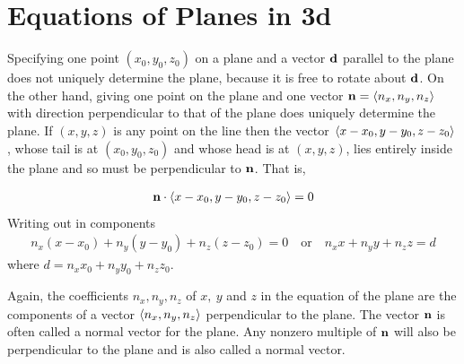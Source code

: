 \section{Equations of Planes in 3d}\label{sec planes 3d}
Specifying one point $(x_0,y_0,z_0)$ on a plane and a vector $\mathbf{d}$ parallel
to the plane does not uniquely determine the plane, because it is free
to rotate about $\mathbf{d}$. On the other hand, giving one point
%
on the plane and one vector $\mathbf{n}=\left< n_x,n_y, n_z\right> $ with direction 
perpendicular to that of the plane does uniquely determine the plane.
If $(x,y,z)$ is any point on the line then the vector 
$\left< x-x_0,y-y_0,z-z_0\right> $,
whose tail is at $(x_0,y_0,z_0)$ and whose head is at $(x,y,z)$,  lies
entirely inside the plane and so must be perpendicular to $\mathbf{n}$. That is,
\begin{impeqn}\label{eqn of plane}
\begin{align*}
  \mathbf{n}\cdot\left< x-x_0,y-y_0,z-z_0\right> =0
\end{align*}
Writing out in components
\begin{align*}
   n_x(x-x_0)+n_y(y-y_0)+n_z(z-z_0)=0
\quad\text{or}\quad n_xx+n_yy+n_zz= d
\end{align*}
where $d=n_xx_0+n_yy_0+n_zz_0$.
\end{impeqn}\noindent
Again, the coefficients $n_x,n_y,n_z$ of $x,\ y$ and $z$ in the equation
of the plane are the components of a vector $\left< n_x,n_y,n_z\right> $ 
perpendicular to the plane. The vector $\mathbf{n}$ is often called a normal vector
for the plane. Any nonzero multiple of $\mathbf{n}$ will also be perpendicular
to the plane and is also called a normal vector.

